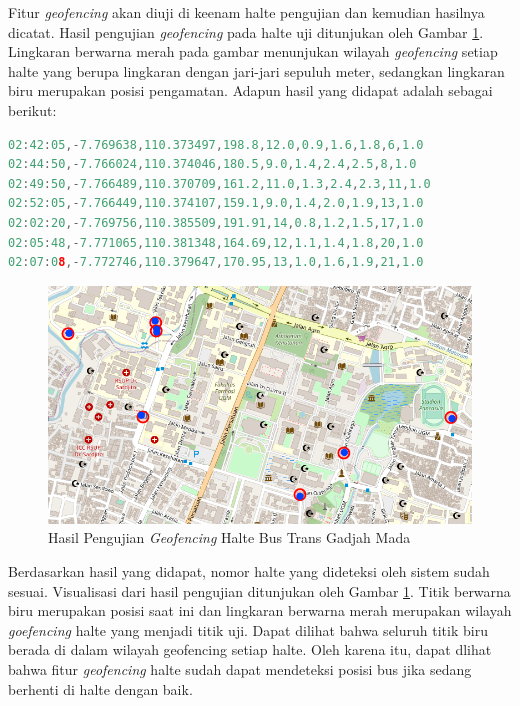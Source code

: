 Fitur \textit{geofencing} akan diuji di keenam halte pengujian dan kemudian hasilnya dicatat. Hasil pengujian \textit{geofencing} pada halte uji ditunjukan oleh Gambar \ref{Fig: geofencing-2}. Lingkaran berwarna merah pada gambar menunjukan wilayah \textit{geofencing} setiap halte yang berupa lingkaran dengan jari-jari sepuluh meter, sedangkan lingkaran biru merupakan posisi pengamatan. Adapun hasil yang didapat adalah sebagai berikut:

\vspace{0.3cm}
\begin{lstlisting}[language=c]
02:42:05,-7.769638,110.373497,198.8,12.0,0.9,1.6,1.8,6,1.0
02:44:50,-7.766024,110.374046,180.5,9.0,1.4,2.4,2.5,8,1.0
02:49:50,-7.766489,110.370709,161.2,11.0,1.3,2.4,2.3,11,1.0
02:52:05,-7.766449,110.374107,159.1,9.0,1.4,2.0,1.9,13,1.0
02:02:20,-7.769756,110.385509,191.91,14,0.8,1.2,1.5,17,1.0
02:05:48,-7.771065,110.381348,164.69,12,1.1,1.4,1.8,20,1.0
02:07:08,-7.772746,110.379647,170.95,13,1.0,1.6,1.9,21,1.0
\end{lstlisting}

\begin{figure}[H]
	\centering
	\includegraphics[width=12cm]{contents/chapter-4/geofencing/halte.png}
	\caption{Hasil Pengujian \textit{Geofencing}  Halte Bus Trans Gadjah Mada}
	\label{Fig: geofencing-2}
\end{figure}

Berdasarkan hasil yang didapat, nomor halte yang dideteksi oleh sistem sudah sesuai. Visualisasi dari hasil pengujian ditunjukan oleh Gambar \ref{Fig: geofencing-2}. Titik berwarna biru merupakan posisi saat ini dan lingkaran berwarna merah merupakan wilayah \textit{goefencing} halte yang menjadi titik uji. Dapat dilihat bahwa seluruh titik biru berada di dalam wilayah geofencing setiap halte. Oleh karena itu, dapat dlihat bahwa fitur \textit{geofencing} halte sudah dapat mendeteksi posisi bus jika sedang berhenti di halte dengan baik.

